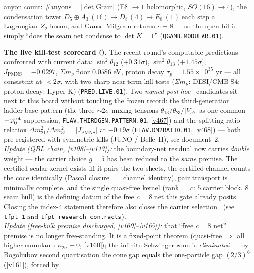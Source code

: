 anyon count: $\#\text{anyons}=|\det\mathrm{Gram}|$ (E8 $\to1$ holomorphic, $SO(16)\to4$), the
condensation tower $D_5{\oplus}A_3\,(16)\to D_8\,(4)\to E_8\,(1)$ each step a Lagrangian $Z_2$ boson, and
Gauss--Milgram returns $c{=}8$ --- so the open bit is simply ``does the seam net condense to $\det K{=}1$''
(\texttt{QGAMB.MODULAR.01}).
\par\smallskip\noindent\textbf{The live kill-test scorecard ().} The
recent round's computable predictions confronted with current data: $\sin^2\theta_{12}$ ($+0.31\sigma$),
$\sin^2\theta_{13}$ ($+1.45\sigma$), $J_{\mathrm{PMNS}}{=}{-}0.0297$, $\Sigma m_\nu$ floor $0.0586$ eV,
proton decay $\tau_p{=}1.55{\times}10^{35}$ yr --- all consistent at $<2\sigma$, with two sharp near-term kill
tests ($\Sigma m_\nu$: DESI/CMB-S4; proton decay: Hyper-K) (\texttt{PRED.LIVE.01}). Two \emph{named post-hoc}
\mO\ candidates sit next to this board without touching the frozen record: the third-generation ladder-base
pattern (the three ${\sim}2\sigma$ mixing tensions $\theta_{13}/\theta_{23}/|V_{cb}|$ as one common $-\varphi_0^{\mathrm{ret}}$
suppression, \texttt{FLAV.THIRDGEN.PATTERN.01}, \vref{v467}) and the splitting-ratio relation
$\Delta m^2_{21}/\Delta m^2_{31}=|J_{\mathrm{PMNS}}|$ at $-0.19\sigma$ (\texttt{FLAV.DM2RATIO.01}, \vref{v468})
--- both pre-registered with symmetric kills (JUNO / Belle~II), see document~2.
\smallskip\\
\noindent\emph{Update (QBL chain, \vref{v108}--\vref{v113}):} the boundary-net residual now carries \emph{double}
weight --- the carrier choice $g=5$ has been reduced to the \emph{same} premise. The certified scalar
kernel exists iff it pairs the two sheets, the certified channel counts the code identically (Pascal
closure $=$ channel identity), pair transport is minimally complete, and the single quasi-free kernel
(rank $=c$: $5$ carrier block, $8$ seam hull) is the defining datum of the free $c=8$ net this gate
already posits. Closing the index-$4$ statement therefore also closes the carrier selection \mE\
(see \texttt{tfpt\_1} and \texttt{tfpt\_research\_contracts}). 
\smallskip\\
\noindent\emph{Update (free-bulk premise discharged, \vref{v160}--\vref{v165}):} that ``free $c{=}8$ net''
premise is no longer free-standing. It is a fixed-point theorem (quasi-free $\Rightarrow$ all higher
cumulants $\kappa_{2n}{=}0$, \vref{v160}); the infinite Schwinger cone is \emph{eliminated} --- by
Bogoliubov second quantisation the cone gap equals the one-particle gap $(2/3)^6$ (\vref{v161}), forced by

